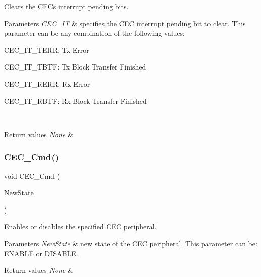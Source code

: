Clears the C\+EC\textquotesingle{}s interrupt pending bits. 


\begin{DoxyParams}{Parameters}
{\em C\+E\+C\+\_\+\+IT} & specifies the C\+EC interrupt pending bit to clear. This parameter can be any combination of the following values\+: \begin{DoxyItemize}
\item C\+E\+C\+\_\+\+I\+T\+\_\+\+T\+E\+RR\+: Tx Error \item C\+E\+C\+\_\+\+I\+T\+\_\+\+T\+B\+TF\+: Tx Block Transfer Finished \item C\+E\+C\+\_\+\+I\+T\+\_\+\+R\+E\+RR\+: Rx Error \item C\+E\+C\+\_\+\+I\+T\+\_\+\+R\+B\+TF\+: Rx Block Transfer Finished \end{DoxyItemize}
\\
\hline
\end{DoxyParams}

\begin{DoxyRetVals}{Return values}
{\em None} & \\
\hline
\end{DoxyRetVals}
\mbox{\label{group___c_e_c___private___functions_ga0c8efa79e5768930e567b3b3ed6e09e9}} 
\subsubsection{\texorpdfstring{CEC\_Cmd()}{CEC\_Cmd()}}
{\footnotesize\ttfamily void C\+E\+C\+\_\+\+Cmd (\begin{DoxyParamCaption}\item[{\mbox{\hyperlink{group___exported__types_gac9a7e9a35d2513ec15c3b537aaa4fba1}{Functional\+State}}}]{New\+State }\end{DoxyParamCaption})}



Enables or disables the specified C\+EC peripheral. 


\begin{DoxyParams}{Parameters}
{\em New\+State} & new state of the C\+EC peripheral. This parameter can be\+: E\+N\+A\+B\+LE or D\+I\+S\+A\+B\+LE. \\
\hline
\end{DoxyParams}

\begin{DoxyRetVals}{Return values}
{\em None} & \\
\hline
\end{DoxyRetVals}
\mbox{\label{group___c_e_c___private___functions_ga604c3b15b51a46303c201fa3deac2212}} 
